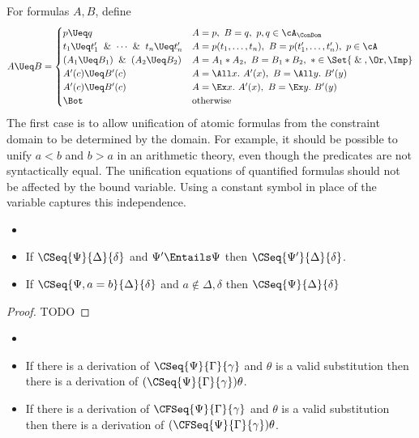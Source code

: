 \begin{definition}
  For formulas $A,B$, define
  \[
  A\Ueq B=
  \begin{cases}
    p\Ueq q & A=p,~B=q,~p,q\in\cA_{\ConDom}\\
    t_1\Ueq t_1'\And\cdots\And t_n\Ueq t_n' & A = p(t_1,\ldots,t_n),~B=p(t_1',\ldots,t_n'),~ p\in\cA\\
    (A_1\Ueq B_1) \And (A_2\Ueq B_2) & A=A_1*A_2,~B=B_1*B_2,~*\in\Set{\And,\Or,\Imp}\\
    A'(c)\Ueq B'(c) & A=\All x.~A'(x),~B=\All y.~B'(y) \\
    A'(c)\Ueq B'(c) & A=\Ex x.~A'(x),~B=\Ex y.~B'(y) \\
    \Bot & \mbox{otherwise}\\
  \end{cases}
  \]
  The first case is to allow unification of atomic formulas from the constraint
  domain to be determined by the domain.  For example, it should be possible to
  unify $a < b$ and $b > a$ in an arithmetic theory, even though the predicates
  are not syntactically equal.
  The unification equations of quantified formulas should not be affected by
  the bound variable.  Using a constant symbol in place of the variable captures
  this independence.
\end{definition}

\begin{theorem}[Strengthening]
  \label{constr.thm.strengthen}
  \begin{itemize}
  \item[]
  \item If $\CSeq{\Psi}{\Delta}{\delta}$ and $\Psi'\Entails\Psi$ then
    $\CSeq{\Psi'}{\Delta}{\delta}$.
  \item If $\CSeq{\Psi,a=b}{\Delta}{\delta}$ and $a\not\in\Delta,\delta$ then
    $\CSeq{\Psi}{\Delta}{\delta}$
  \end{itemize}
\end{theorem}

\begin{proof}
  TODO
\end{proof}

\begin{theorem}[Substitution]
  \label{constr.thm.subst}
  \begin{itemize}
  \item[]
  \item
    If there is a derivation of $\CSeq{\Psi}{\Gamma}{\gamma}$ and $\theta$
    is a valid substitution then
    there is a derivation of $(\CSeq{\Psi}{\Gamma}{\gamma})\theta$.
  \item
    If there is a derivation of $\CFSeq{\Psi}{\Gamma}{\gamma}$ and $\theta$
    is a valid substitution then
    there is a derivation of $(\CFSeq{\Psi}{\Gamma}{\gamma})\theta$.
  \end{itemize}
\end{theorem}

